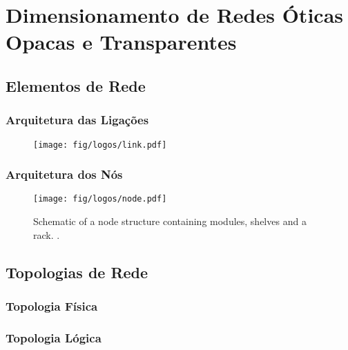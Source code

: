\chapter{Dimensionamento de Redes Óticas Opacas e Transparentes}
\label{chapter2}

\section{Elementos de Rede}
\label{networkArchitecture}

\subsection{Arquitetura das Ligações}

\begin{figure}[H]
  \label{cisco}
  \begin{center}
    \texttt{[image: fig/logos/link.pdf]}
  \end{center}
\end{figure}

\subsection{Arquitetura dos Nós}

 \begin{figure}[H]
  \label{cisco}
  \begin{center}
    \texttt{[image: fig/logos/node.pdf]}
    \caption{Schematic of a node structure containing modules, shelves and a rack. \cite{6515886}.}
  \end{center}
\end{figure}

\clearpage

\section{Topologias de Rede}
\label{networkTopologies}

\subsection{Topologia Física}

\subsection{Topologia Lógica}


